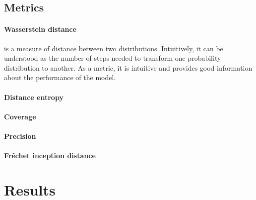 \documentclass{article}
\begin{document}
\subsection{Metrics}

\paragraph{Wasserstein distance} is a measure of distance between two distributions. Intuitively, it can be understood as the number of steps needed to transform one probability distribution to another. \cite{lil} As a metric, it is intuitive and provides good information about the performance of the model.

\paragraph{Distance entropy}

\paragraph{Coverage}

\paragraph{Precision}

\paragraph{Fréchet inception distance}

\section{Results}
\end{document}
